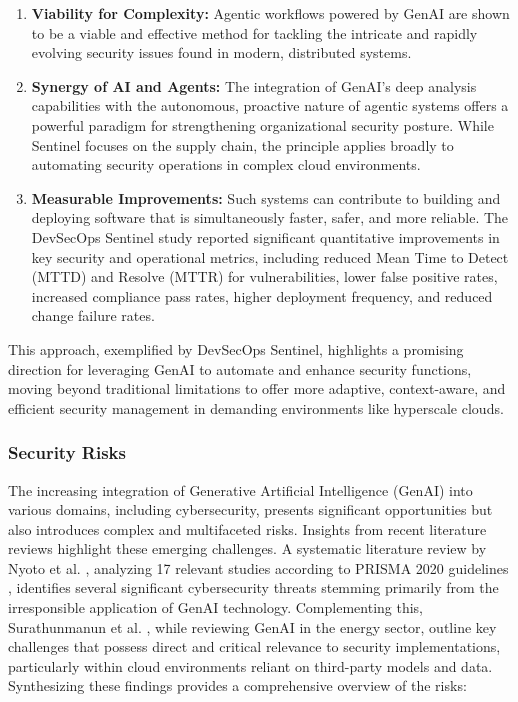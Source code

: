 \begin{enumerate}
    \item \textbf{Viability for Complexity:} Agentic workflows powered by GenAI are shown to be a viable and effective method for tackling the intricate and rapidly evolving security issues found in modern, distributed systems\cite{noauthor_devsecops_nodate}.
    \item \textbf{Synergy of AI and Agents:} The integration of GenAI's deep analysis capabilities with the autonomous, proactive nature of agentic systems offers a powerful paradigm for strengthening organizational security posture\cite{noauthor_devsecops_nodate}. While Sentinel focuses on the supply chain, the principle applies broadly to automating security operations in complex cloud environments.
    \item \textbf{Measurable Improvements:} Such systems can contribute to building and deploying software that is simultaneously faster, safer, and more reliable. The DevSecOps Sentinel study reported significant quantitative improvements in key security and operational metrics, including reduced Mean Time to Detect (MTTD) and Resolve (MTTR) for vulnerabilities, lower false positive rates, increased compliance pass rates, higher deployment frequency, and reduced change failure rates\cite{noauthor_devsecops_nodate}.
\end{enumerate}

This approach, exemplified by DevSecOps Sentinel, highlights a promising direction for leveraging GenAI to automate and enhance security functions, moving beyond traditional limitations to offer more adaptive, context-aware, and efficient security management in demanding environments like hyperscale clouds.


\subsubsection{Security Risks} %
\label{sec:Security Risks}

The increasing integration of Generative Artificial Intelligence (GenAI) into various domains, including cybersecurity, presents significant opportunities but also introduces complex and multifaceted risks. Insights from recent literature reviews highlight these emerging challenges. A systematic literature review by Nyoto et al. \cite{nyoto_cyber_2024}, analyzing 17 relevant studies according to PRISMA 2020 guidelines \cite{page_prisma_2021}, identifies several significant cybersecurity threats stemming primarily from the irresponsible application of GenAI technology. Complementing this, Surathunmanun et al. \cite{surathunmanun_exploring_2024}, while reviewing GenAI in the energy sector, outline key challenges that possess direct and critical relevance to security implementations, particularly within cloud environments reliant on third-party models and data. Synthesizing these findings provides a comprehensive overview of the risks:

